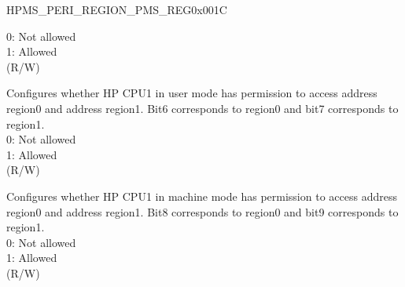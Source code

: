 \begin{register}{H}{PMS\_PERI\_REGION\_PMS\_REG}{0x001C}
\begin{regdesc}
\begin{reglist}
0: Not allowed \\
1: Allowed\\ (R/W)
\label{fielddesc:PMSHPCORE1UMREGIONPMS}\item [PMS\_HP\_CORE1\_UM\_REGION\_PMS] Configures whether HP CPU1 in user mode has permission to access address region0 and address region1. Bit6 corresponds to region0 and bit7 corresponds to region1.\\
0: Not allowed \\
1: Allowed\\ (R/W)
\label{fielddesc:PMSHPCORE1MMREGIONPMS}\item [PMS\_HP\_CORE1\_MM\_REGION\_PMS] Configures whether HP CPU1 in machine mode has permission to access address region0 and address region1. Bit8 corresponds to region0 and bit9 corresponds to region1.\\
0: Not allowed \\
1: Allowed\\ (R/W)
\end{reglist}\end{regdesc}
\end{register}


